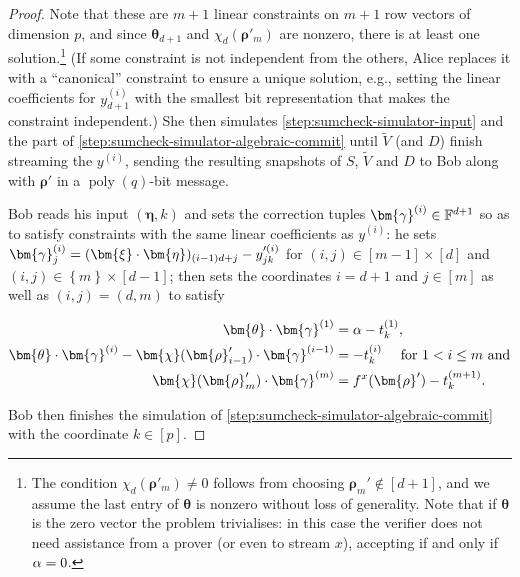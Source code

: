 \documentclass[10pt,a4paper]{article}
\theoremstyle{definition}
\newcommand{\field}{\mathbb{F}}
\renewcommand{\set}[1]{\left\{#1\right\}}
\newcommand{\poly}{\operatorname{poly}}
\newcommand{\pcommitlength}{p}
\newcommand{\pcommitstring}{y}
\newcommand{\dimension}{m}
\newcommand{\degree}{d}
\newcommand{\fieldsize}{q}
\newcommand{\fingerprinttuple}{\bm{\rho}}
\def\fe#1{
    \ifnum#1=1
        \alpha
    \else
    \ifnum#1=2
        \beta
    \else
    \ifnum#1=3
        \gamma
    \fi\fi\fi
}
\begin{document}
\begin{proof}
    Note that these are $\dimension + 1$ linear constraints on $\dimension + 1$ row vectors of dimension $\pcommitlength$, and since $\bm{\theta}_{\degree + 1}$ and $\chi_\degree(\fingerprinttuple'_\dimension)$ are nonzero, there is at least one solution.\footnote{The condition $\chi_\degree(\fingerprinttuple'_\dimension) \neq 0$ follows from choosing $\fingerprinttuple_\dimension' \notin [\degree + 1]$, and we assume the last entry of $\bm{\theta}$ is nonzero without loss of generality. Note that if $\bm{\theta}$ is the zero vector the problem trivialises: in this case the verifier does not need assistance from a prover (or even to stream $x$), accepting if and only if $\fe1 = 0$.} (If some constraint is not independent from the others, Alice replaces it with a ``canonical'' constraint to ensure a unique solution, e.g., setting the linear coefficients for $\pcommitstring^{(i)}_{\degree + 1}$ with the smallest bit representation that makes the constraint independent.) She then simulates \cref{step:sumcheck-simulator-input} and the part of \cref{step:sumcheck-simulator-algebraic-commit} until $\widetilde V$ (and $D$) finish streaming the $\pcommitstring^{(i)}$, sending the resulting snapshots of $S$, $\widetilde V$ and $D$ to Bob along with $\fingerprinttuple'$ in a $\poly(\fieldsize)$-bit message.
    
    Bob reads his input $(\bm{\eta}, k)$ and sets the correction tuples $\bm{\fe3}^{(i)} \in \field^{\degree + 1}$ so as to satisfy constraints with the same linear coefficients as $\pcommitstring^{(i)}$: he sets $\bm{\fe3}^{(i)}_j  = (\bm{\xi} \cdot \bm{\eta})_{(i - 1) \degree + j} - \pcommitstring'^{(i)}_{jk}$ for $(i, j) \in [\dimension - 1] \times [\degree]$ and $(i, j) \in \set{\dimension} \times [\degree - 1]$; then sets the coordinates $i = \degree + 1$ and $j \in [\dimension]$ as well as $(i, j) = (\degree, \dimension)$ to satisfy
    
    \begin{align*}
        \bm{\theta} \cdot \bm{\fe3}^{(1)} &= \fe1 - t_k^{(1)},\\
        \bm{\theta} \cdot \bm{\fe3}^{(i)} - \bm{\chi}(\fingerprinttuple_{i-1}') \cdot \bm{\fe3}^{(i-1)} &= -t_k^{(i)} \quad\text{ for } 1 < i \leq \dimension \text { and}\\
        \bm{\chi}(\fingerprinttuple_\dimension') \cdot \bm{\fe3}^{(\dimension)} &= f^x(\fingerprinttuple') - t_k^{(\dimension+1)}.
    \end{align*}
    
    Bob then finishes the simulation of \cref{step:sumcheck-simulator-algebraic-commit} with the coordinate $k \in [\pcommitlength]$.
    

\end{proof}
\end{document}
